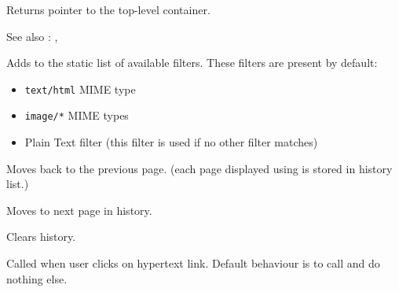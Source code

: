 
Returns pointer to the top-level container.

See also : 
,


\label{wxhtmlwindowaddfilter}


Adds  to the static list of available
filters. These filters are present by default:

\begin{itemize}
\item {\tt text/html} MIME type
\item {\tt image/*} MIME types
\item Plain Text filter (this filter is used if no other filter matches)
\end{itemize}


\label{wxhtmlwindowhistoryback}


Moves back to the previous page. (each page displayed using 
 is stored in history list.)


\label{wxhtmlwindowhistoryforward}


Moves to next page in history.

\label{wxhtmlwindowhistoryclear}


Clears history.


\label{wxhtmlwindowonlinkclicked}


Called when user clicks on hypertext link. Default behaviour is to call
 and do nothing else.


